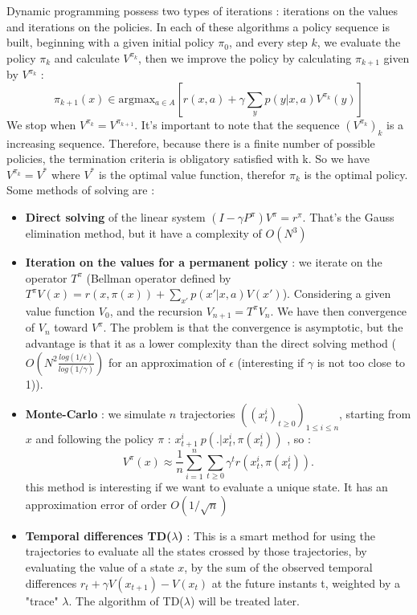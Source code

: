 \documentclass[conference]{IEEEtran}
\begin{document}
Dynamic programming possess two types of iterations : iterations on the values and iterations on the policies. 
In each of these algorithms a policy sequence is built,
beginning with a given initial policy $\pi_0$, and every step $k$, we evaluate the policy $\pi_k$ and calculate $V^{\pi_k}$, then we improve the policy by calculating $\pi_{k+1}$ given by $V^{\pi_k}$ :
\[ \pi_{k+1}(x) \in \mbox{arg} \mbox{max}_{a \in A}[r(x,a) + \gamma\sum_yp(y|x,a)V^{\pi_k}(y)] 	\]
We stop when $V^{\pi_k} = V^{\pi_{k+1}}$.
It's important to note that the sequence $(V^{\pi_k})_k$ is a increasing sequence. Therefore, because there is a finite number of possible policies, the termination criteria is obligatory satisfied with k. So we have $V^{\pi_k} = V^*$ where $V^*$ is the optimal value function, therefor $\pi_k$ is the optimal policy.
Some methods of solving are :
\begin{itemize}
 \item \textbf{Direct solving} of the linear system $(I-\gamma P^{\pi})V^{\pi} = r^{\pi}$. That's the Gauss elimination method, but it have a complexity of $O(N^3)$
 \item \textbf{Iteration on the values for a permanent policy} : we iterate on the operator $T^{\pi}$ (Bellman operator defined by $T^{\pi}V(x) = r(x, \pi(x))+\sum_{x'} p(x'|x,a)V(x')$). Considering a given value function $V_0$, and the recursion $V_{n+1} = T^{\pi} V_n$. 
We have then convergence of $V_n$ toward $V^{\pi}$. The problem is that the convergence is asymptotic, but the advantage is that it as a lower complexity than the direct solving method ($O(N^2 \frac{log(1/\epsilon)}{log(1/\gamma)})$ for an approximation of $\epsilon$ (interesting if $\gamma$ is not too close to 1)).
 \item \textbf{Monte-Carlo} : we simulate $n$ trajectories $((x_t^i)_{t \geqslant 0})_{1 \leqslant i \leqslant n}$, starting from $x$ and following the policy $\pi$ : $x_{t+1}^i ~ p(.|x_t^i,\pi(x^i_t))$ , so :
 \begin{equation*}
 V^{\pi}(x) \approx \frac{1}{n} \sum_{i=1}^n \sum_{t \geqslant 0} \gamma^t r(x^i_t, \pi(x^i_t)).
 \end{equation*}
 this method is interesting if we want to evaluate a unique state. It has an approximation error of order $O(1/\sqrt{n})$
 \item \textbf{Temporal differences TD($\lambda$)} : This is a smart method for using the trajectories to evaluate all the states crossed by those trajectories, by evaluating the value of a state $x$, by the sum of the observed temporal differences $r_t+\gamma V(x_{t+1}) - V(x_t)$ at the future instants t, weighted by a "trace" $\lambda$. The algorithm of TD($\lambda$) will be treated later.
\end{itemize}
\end{document}
